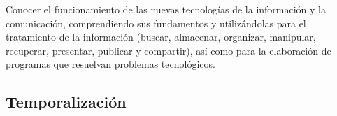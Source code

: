 Conocer el funcionamiento de las nuevas tecnologías de la información y la comunicación, comprendiendo sus fundamentos y utilizándolas para el tratamiento de la información (buscar, almacenar, organizar, manipular, recuperar, presentar, publicar y compartir), así como para la elaboración de programas que resuelvan problemas tecnológicos.

\subsection{Temporalización}




